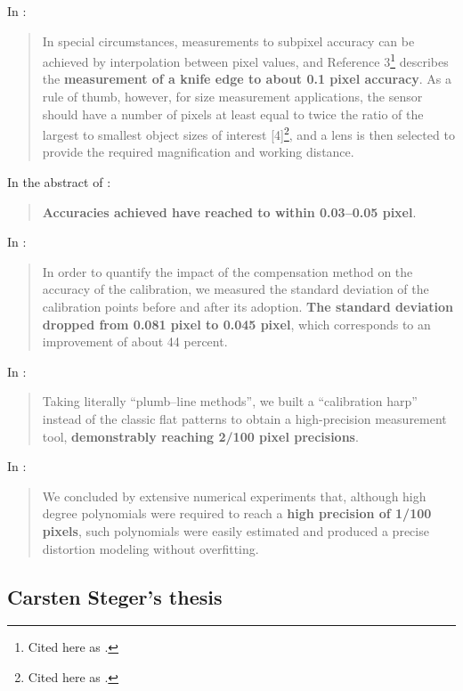 \documentclass[a4paper,12pt]{article}
\begin{document}
In \cite{eren2014measurement}:
\begin{quotation}
In special circumstances, measurements to subpixel accuracy can be achieved by
interpolation between pixel values, and Reference 3\footnote{Cited here as \cite{knives}.} describes the \textbf{measurement of a knife edge to about
0.1 pixel accuracy}. As a rule of thumb, however, for size measurement applications, the sensor should
have a number of pixels at least equal to twice the ratio of the largest to smallest object sizes of interest
[4]\footnote{Cited here as \cite{hopwood1980design}.}, and a lens is then selected to provide the required magnification and working distance.
\end{quotation}

In the abstract of \cite{MIKHAIL198463}:
\begin{quotation}
\textbf{Accuracies achieved have reached to within 0.03--0.05 pixel}.
\end{quotation}

In \cite{632986}:
\begin{quotation}
In order to quantify the impact of the compensation method on
the accuracy of the calibration, we measured the standard deviation
of the calibration points before and after its adoption. \textbf{The
standard deviation dropped from 0.081 pixel to 0.045 pixel}, which
corresponds to an improvement of about 44 percent.
\end{quotation}

In \cite{Tang:12}:
\begin{quotation}
Taking literally ``plumb--line methods'', we built a ``calibration harp'' instead of the classic 
flat patterns to obtain a high-precision measurement tool, \textbf{demonstrably reaching 
2/100 pixel precisions}. 
\end{quotation}

In \cite{7885103}:
\begin{quotation}
We concluded by extensive numerical experiments that, although high degree polynomials were 
required to reach a \textbf{high precision of 1/100 pixels}, such polynomials were easily 
estimated and produced a precise distortion modeling without overfitting.
\end{quotation}



\subsection{Carsten Steger's thesis}
\end{document}
